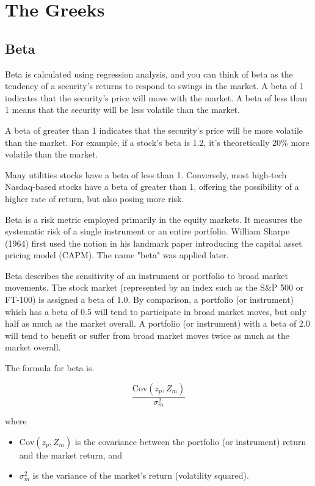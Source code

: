 
\section{The Greeks}
\subsection{Beta}

Beta is calculated using regression analysis, and you can think of beta as the tendency of a security's returns to respond to swings in the market. A beta of 1 indicates that the security's price will move with the market. A beta of less than 1 means that the security will be less volatile than the market.

 

A beta of greater than 1 indicates that the security's price will be more volatile than the market. For example, if a stock's beta is 1.2, it's theoretically 20\% more volatile than the market.


Many utilities stocks have a beta of less than 1. Conversely, most high-tech Nasdaq-based stocks have a beta of greater than 1, offering the possibility of a higher rate of return, but also posing more risk.

 


Beta is a risk metric employed primarily in the equity markets. It measures the systematic risk of a single instrument or an entire portfolio. William Sharpe (1964) first used the notion in his landmark paper introducing the capital asset pricing model (CAPM). The name "beta" was applied later.

Beta describes the sensitivity of an instrument or portfolio to broad market movements. The stock market (represented by an index such as the S&P 500 or FT-100) is assigned a beta of 1.0. By comparison, a portfolio (or instrument) which has a beta of 0.5 will tend to participate in broad market moves, but only half as much as the market overall. A portfolio (or instrument) with a beta of 2.0 will tend to benefit or suffer from broad market moves twice as much as the market overall.

The formula for beta is.

\[ \frac{  \mbox{Cov} (z_p, Z_m)}{ \sigma^2_m}\]




where

\begin{itemize}
\item $\mbox{Cov} (z_p, Z_m)$ is the covariance between the portfolio (or instrument) return and the market return, and
\item $\sigma^2_m$ is the variance of the market's return (volatility squared).
\end{itemize}
 

